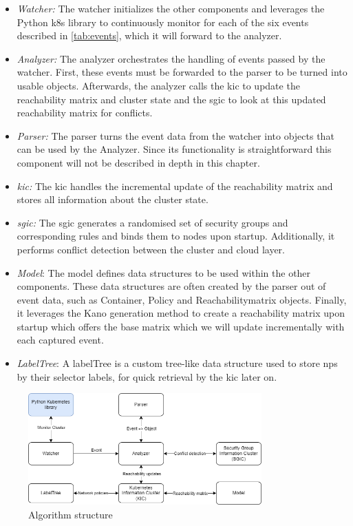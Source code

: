 \begin{itemize}
    \renewcommand{\labelitemi}{\scriptsize$\blacksquare$}
    \item \textit{Watcher:} The watcher initializes the other components and leverages the Python \acrshort{k8s} library to continuously monitor for each of the six events described in \autoref{tab:events}, which it will forward to the analyzer.
    \item \textit{Analyzer:} The analyzer orchestrates the handling of events passed by the watcher. First, these events must be forwarded to the parser to be turned into usable objects. Afterwards, the analyzer calls the \acrshort{kic} to update the reachability matrix and cluster state and the \acrshort{sgic} to look at this updated reachability matrix for conflicts.
    \item \textit{Parser:} The parser turns the event data from the watcher into objects that can be used by the Analyzer. Since its functionality is straightforward this component will not be described in depth in this chapter.
    \item \textit{\acrfull{kic}:} The \acrshort{kic} handles the incremental update of the reachability matrix and stores all information about the cluster state.
    \item \textit{\acrfull{sgic}:} The \acrshort{sgic} generates a randomised set of security groups and corresponding rules and binds them to nodes upon startup. Additionally, it performs conflict detection between the cluster and cloud layer.
    \item  \textit{Model}: The model defines data structures to be used within the other components. These data structures are often created by the parser out of event data, such as Container, Policy and Reachabilitymatrix objects. Finally, it leverages the Kano generation method to create a reachability matrix upon startup which offers the base matrix which we will update incrementally with each captured event.
    \item  \textit{LabelTree}: A labelTree is a custom tree-like data structure used to store \acrshort{np}s by their selector labels, for quick retrieval by the \acrshort{kic} later on.
\end{itemize}
\begin{figure}[htbp]
  \centering
  \includegraphics[width=0.8\textwidth]{images/algo-components.png}
  \caption{Algorithm structure}
  \label{fig:algorithm}
\end{figure}



